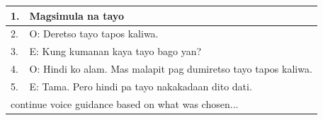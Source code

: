 \begin{table}[h]
\begin{tabular}{ll}
1.                      & Magsimula na tayo                                             \\ \hline
\multicolumn{1}{|l}{2.} & \multicolumn{1}{l|}{O: Deretso tayo tapos kaliwa.}            \\
\multicolumn{1}{|l}{3.} & \multicolumn{1}{l|}{E: Kung kumanan kaya tayo bago yan?}      \\
\multicolumn{1}{|l}{4.} & \multicolumn{1}{l|}{O: Hindi ko alam. Mas malapit pag dumiretso tayo tapos kaliwa.}          \\
\multicolumn{1}{|l}{5.} & \multicolumn{1}{l|}{E: Tama. Pero hindi pa tayo nakakadaan dito dati.}                       \\ \hline
\multicolumn{2}{l}{continue voice guidance based on what was chosen...}                 \\ \hline
\end{tabular}
\end{table}

